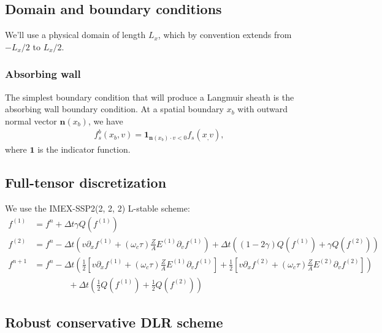 \documentclass{article}
\begin{document}
\subsection{Domain and boundary conditions}

We'll use a physical domain of length $L_x$, which by convention extends from $-L_x/2$ to $L_x/2$.

\subsubsection{Absorbing wall}
The simplest boundary condition that will produce a Langmuir sheath is the absorbing wall
boundary condition. At a spatial boundary $x_b$ with outward normal vector $\mathbf{n}(x_b)$, we have
\begin{align}
    f_s^b(x_b, v) = \mathbf{1}_{\mathbf{n}(x_b) \cdot v < 0} f_s(x_, v),
\end{align}
where $\mathbf{1}$ is the indicator function.

\subsection{Full-tensor discretization}

We use the IMEX-SSP2(2, 2, 2) L-stable scheme:
\begin{align*}
    f^{(1)} &= f^n + \Delta t \gamma Q(f^{(1)}) \\
    f^{(2)} &= f^n - \Delta t  \left( v \partial_x f^{(1)} + (\omega_c \tau) \frac{Z}{A} E^{(1)} \partial_v f^{(1)} \right) + \Delta t \left( (1 - 2\gamma) Q(f^{(1)}) + \gamma Q(f^{(2)}) \right)  \\
    f^{n+1} &= f^n - \Delta t \left( \frac{1}{2} \left[ v \partial_x f^{(1)} + (\omega_c \tau) \frac{Z}{A} E^{(1)} \partial_v f^{(1)} \right]  + \frac{1}{2} \left[ v \partial_x f^{(2)} + (\omega_c \tau) \frac{Z}{A} E^{(2)} \partial_v f^{(2)} \right] \right)  \\
            &\qquad \qquad + \Delta t \left( \frac{1}{2} Q(f^{(1)}) + \frac{1}{2} Q(f^{(2)}) \right) 
\end{align*}

\subsection{Robust conservative DLR scheme}
\end{document}
